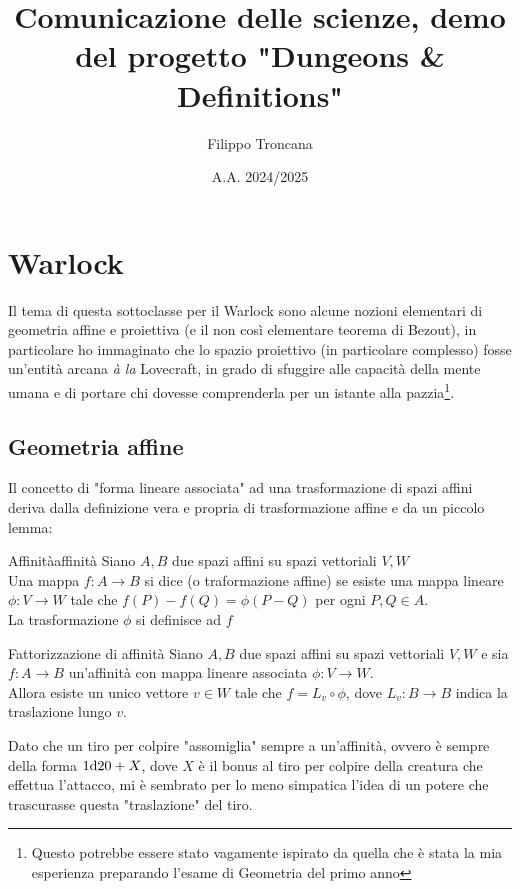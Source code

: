 \documentclass{article}
\title{Comunicazione delle scienze, demo del progetto "Dungeons \& Definitions"}
\author{Filippo Troncana}
\date{A.A. 2024/2025}
\begin{document}
\maketitle 

\section{Warlock}

Il tema di questa sottoclasse per il Warlock sono alcune nozioni elementari di geometria affine e proiettiva (e il non così elementare teorema di Bezout), in particolare ho immaginato che lo spazio proiettivo (in particolare complesso) fosse un'entità arcana \textit{à la} Lovecraft, in grado di sfuggire alle capacità della mente umana e di portare chi dovesse comprenderla per un istante alla pazzia\footnote{Questo potrebbe essere stato vagamente ispirato da quella che è stata la mia esperienza preparando l'esame di Geometria del primo anno}.

\subsection{Geometria affine}

Il concetto di "forma lineare associata" ad una trasformazione di spazi affini deriva dalla definizione vera e propria di trasformazione affine e da un piccolo lemma:

\begin{definition}{Affinità}{affinità}
    Siano $A,B$ due spazi affini su spazi vettoriali $V,W$\\ 
    Una mappa $f: A\to B$ si dice  (o traformazione affine) se esiste una mappa lineare $\phi: V\to W$ tale che $f(P)-f(Q) = \phi(P-Q)$ per ogni $P,Q \in A$.\\
    La trasformazione $\phi$ si definisce  ad $f$
\end{definition}
\begin{lemma}{Fattorizzazione di affinità}{}
    Siano $A,B$ due spazi affini su spazi vettoriali $V,W$ e sia $f: A\to B$ un'affinità con mappa lineare associata $\phi: V\to W$.\\
    Allora esiste un unico vettore $v \in W$ tale che $f = L_v \circ \phi$, dove $L_v : B\to B$ indica la traslazione lungo $v$.
\end{lemma}

Dato che un tiro per colpire "assomiglia" sempre a un'affinità, ovvero è sempre della forma $1\text{d} 20 +X$, dove $X$ è il bonus al tiro per colpire della creatura che effettua l'attacco, mi è sembrato per lo meno simpatica l'idea di un potere che trascurasse questa "traslazione" del tiro.
\end{document}
